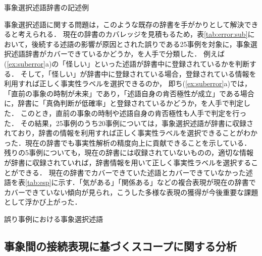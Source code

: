 \documentclass[japanese]{jnlp_1.4}
\begin{document}
\begin{table}[t]
\caption{事象選択述語辞書の記述例}
\label{tab_mkd}

\end{table}

事象選択述語に関する問題は，このような既存の辞書を手がかりとして解決できると考えられる．
現在の辞書のカバレッジを見積もるため，表\ref{tab:error:sub}において，後続する述語の影響が原因とされた誤りである25事例を対象に，事象選択述語辞書がカバーできているかどうか，を人手で分類した．
例えば(\ref{ex:suberror}a)の「怪しい」といった述語が辞書中に登録されているかを判断する．
そして，「怪しい」が辞書中に登録されている場合，登録されている情報を利用すれば正しく事実性ラベルを選択できるのか，
即ち(\ref{ex:suberror}a)では，「直前の事象の時制が未来」であり，「述語自身の肯否極性が成立」である場合に，辞書に「真偽判断が低確率」と登録されているかどうか，を人手で判定した．
このとき，直前の事象の時制や述語自身の肯否極性も人手で判定を行った．
その結果，25事例のうち20事例については，事象選択述語が辞書に収録されており，辞書の情報を利用すれば正しく事実性ラベルを選択できることがわかった．現在の辞書でも事実性解析の精度向上に貢献できることを示している．
残りの5事例についても，現在の辞書には収録されていないものの，適切な情報が辞書に収録されていれば，辞書情報を用いて正しく事実性ラベルを選択することができる．
現在の辞書でカバーできていた述語とカバーできていなかった述語を表\ref{tab:esp}に示す．「気がある」「関係ある」などの複合表現が現在の辞書でカバーできていない傾向が見られ，こうした多様な表現の獲得が今後重要な課題として浮かび上がった．

\begin{table}[t]
\caption{誤り事例における事象選択述語}
\label{tab:esp}

\vspace{-1\Cvs}
\end{table}


\subsection{事象間の接続表現に基づくスコープに関する分析}
\end{document}
